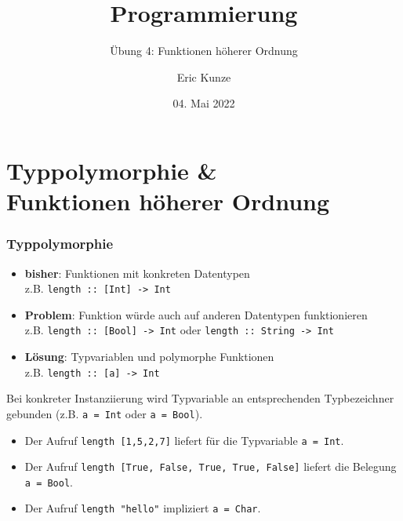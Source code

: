 \documentclass{beamer}
\begin{document}
	
	\title{Programmierung}
	\subtitle{Übung 4: Funktionen höherer Ordnung}
	\author{Eric Kunze}
	\date{04. Mai 2022}
	
	\maketitle
	


\section{Typpolymorphie \& \\ Funktionen höherer Ordnung}

\begin{frame}[fragile, t] \frametitle{Typpolymorphie}
	\footnotesize
	\begin{itemize}
		\item \textbf{bisher}: Funktionen mit konkreten Datentypen \\
		z.B. \texttt{length :: [Int] -> Int}
		\item \textbf{Problem}: Funktion würde auch auf anderen Datentypen funktionieren \\
		z.B. \texttt{length :: [Bool] -> Int} oder \texttt{length :: String -> Int}
		\item \textbf{Lösung}: Typvariablen und polymorphe Funktionen \\
		z.B. \texttt{length :: [\alert{a}] -> Int}
	\end{itemize}
	
	\pause
	
	Bei konkreter Instanziierung wird Typvariable an entsprechenden Typbezeichner gebunden (z.B. \texttt{\alert{a} = Int} oder \texttt{\alert{a} = Bool}).
	
	\begin{itemize}
		\item Der Aufruf \texttt{length [1,5,2,7]} liefert für die Typvariable \texttt{\alert{a} = Int}.
		\item Der Aufruf \texttt{length [True, False, True, True, False]} liefert die Belegung \texttt{\alert{a} = Bool}.
		\item Der Aufruf \texttt{length "hello"} impliziert \texttt{\alert{a} = Char}.
	\end{itemize}
\end{frame}
\end{document}
